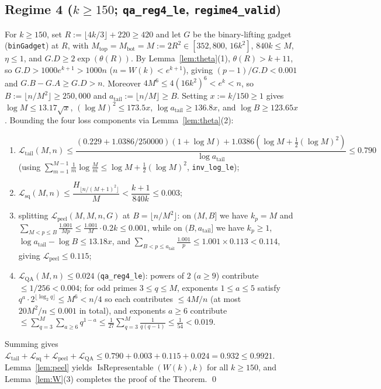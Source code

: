 \documentclass[11pt,a4paper]{amsart}
\theoremstyle{remark}
\newcommand{\Rep}{\operatorname{IsRepresentable}}
\begin{document}
\subsection*{\texorpdfstring{Regime 4 ($k \ge 150$; \texttt{qa\_reg4\_le}, \texttt{regime4\_valid})}{Regime 4 (k >= 150)}}
For $k \ge 150$, set $R := \lfloor 4 k / 3 \rfloor + 220 \ge 420$ and let $G$ be the binary-lifting gadget (\texttt{binGadget}) at $R$, with $M_{\mathrm{top}} = M_{\mathrm{bot}} = M := 2 R^2 \in [352{,}800,\, 16 k^2]$, $840 k \le M$, $\eta \le 1$, and $G.D \ge 2 \exp(\theta(R))$. By Lemma~\ref{lem:theta}(1), $\theta(R) > k + 11$, so $G.D > 1000 e^{k + 1} > 1000 n$ ($n = W(k) < e^{k + 1}$), giving $(p - 1)/G.D < 0.001$ and $G.B - G.A \ge G.D > n$. Moreover $4 M^6 \le 4(16 k^2)^6 < e^k < n$, so $B := \lfloor n / M^2 \rfloor \ge 250{,}000$ and $a_{\mathrm{tail}} := \lfloor n / M \rfloor \ge B$. Setting $x := k / 150 \ge 1$ gives $\log M \le 13.17 \sqrt{x}$, $(\log M)^2 \le 173.5 x$, $\log a_{\mathrm{tail}} \ge 136.8 x$, and $\log B \ge 123.65 x$. Bounding the four loss components via Lemma~\ref{lem:theta}(2):
\begin{enumerate}
\item $\mathcal{L}_{\mathrm{tail}}(M, n) \le \dfrac{(0.229 + 1.0386 / 250000)(1 + \log M) + 1.0386(\log M + \frac{1}{2}(\log M)^2)}{\log a_{\mathrm{tail}}} \le 0.790$ (using $\sum_{m=1}^{M-1} \frac{1}{m}\log\frac{M}{m} \le \log M + \frac{1}{2}(\log M)^2$, \texttt{inv\_log\_le});
\item $\mathcal{L}_{\mathrm{sq}}(M, n) \le \dfrac{H_{\lfloor n / (M+1)^2 \rfloor}}{M} < \dfrac{k + 1}{840 k} \le 0.003$;
\item splitting $\mathcal{L}_{\mathrm{peel}}(M, M, n, G)$ at $B = \lfloor n / M^2 \rfloor$: on $(M, B]$ we have $k_p = M$ and $\sum_{M < p \le B} \frac{1.001}{M p} \le \frac{1.001}{M} \cdot 0.2 k \le 0.001$, while on $(B, a_{\mathrm{tail}}]$ we have $k_p \ge 1$, $\log a_{\mathrm{tail}} - \log B \le 13.18 x$, and $\sum_{B < p \le a_{\mathrm{tail}}} \frac{1.001}{p} \le 1.001 \times 0.113 < 0.114$, giving $\mathcal{L}_{\mathrm{peel}} \le 0.115$;
\item $\mathcal{L}_{\mathrm{QA}}(M, n) \le 0.024$ (\texttt{qa\_reg4\_le}): powers of $2$ ($a \ge 9$) contribute $\le 1/256 < 0.004$; for odd primes $3 \le q \le M$, exponents $1 \le a \le 5$ satisfy $q^a \cdot 2^{\lfloor \log_2 q \rfloor} \le M^6 < n / 4$ so each contributes $\le 4 M / n$ (at most $20 M^2 / n \le 0.001$ in total), and exponents $a \ge 6$ contribute $\le \sum_{q=3}^M \sum_{a \ge 6} q^{1-a} \le \frac{1}{27}\sum_{q=3}^M \frac{1}{q(q-1)} \le \frac{1}{54} < 0.019$.
\end{enumerate}
Summing gives $\mathcal{L}_{\mathrm{tail}} + \mathcal{L}_{\mathrm{sq}} + \mathcal{L}_{\mathrm{peel}} + \mathcal{L}_{\mathrm{QA}} \le 0.790 + 0.003 + 0.115 + 0.024 = 0.932 \le 0.9921$. Lemma~\ref{lem:peel} yields $\Rep(W(k), k)$ for all $k \ge 150$, and Lemma~\ref{lem:W}(3) completes the proof of the Theorem. \qed
\end{document}
